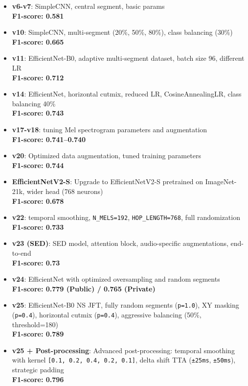 \documentclass[ERTS, 2025]{ERTS}
\begin{document}
\begin{itemize}
    \item \textbf{v6-v7}: SimpleCNN, central segment, basic params\\
    \textbf{F1-score: 0.581}
    
    \item \textbf{v10}: SimpleCNN, multi-segment (20\%, 50\%, 80\%), class balancing (30\%)\\
    \textbf{F1-score: 0.665}
    
    \item \textbf{v11}: EfficientNet-B0, adaptive multi-segment dataset, batch size 96, different LR\\
    \textbf{F1-score: 0.712}
    
    \item \textbf{v14}: EfficientNet, horizontal cutmix, reduced LR, CosineAnnealingLR, class balancing 40\%\\
    \textbf{F1-score: 0.743}
    
    \item \textbf{v17-v18}: tuning Mel spectrogram parameters and augmentation\\
    \textbf{F1-score: 0.741--0.740}
    
    \item \textbf{v20}: Optimized data augmentation, tuned training parameters\\
    \textbf{F1-score: 0.744}
    
    \item \textbf{EfficientNetV2-S}: Upgrade to EfficientNetV2-S pretrained on ImageNet-21k, wider head (768 neurons)\\
    \textbf{F1-score: 0.678}
    
    \item \textbf{v22}:  temporal smoothing, \texttt{N\_MELS=192}, \texttt{HOP\_LENGTH=768}, full randomization\\
    \textbf{F1-score: 0.733}
    
    \item \textbf{v23 (SED)}: SED model, attention block, audio-specific augmentations, end-to-end\\
    \textbf{F1-score: 0.73}
    
    \item \textbf{v24}: EfficientNet with optimized oversampling and random segments\\
    \textbf{F1-score: 0.779 (Public) / 0.765 (Private)}
    
    \item \textbf{v25}: EfficientNet-B0 NS JFT, fully random segments (\texttt{p=1.0}), XY masking (\texttt{p=0.4}), horizontal cutmix (\texttt{p=0.4}), aggressive balancing (50\%, threshold=180)\\
    \textbf{F1-score: 0.789}
    
    \item \textbf{v25 + Post-processing}: Advanced post-processing: temporal smoothing with kernel \texttt{[0.1, 0.2, 0.4, 0.2, 0.1]}, delta shift TTA (\texttt{±25ms}, \texttt{±50ms}), strategic padding\\
    \textbf{F1-score: 0.796}
\end{itemize}
\end{document}
